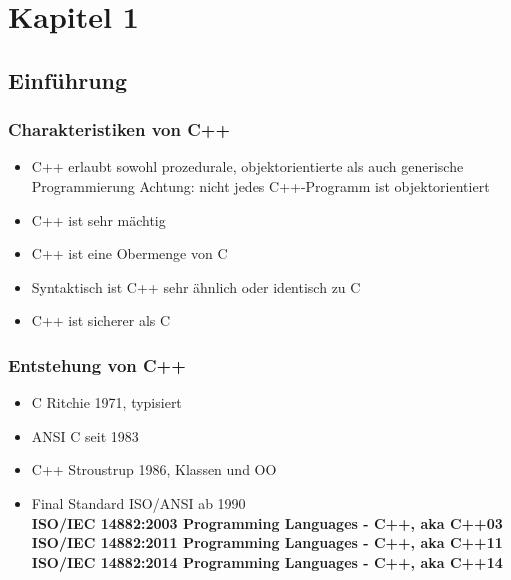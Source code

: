 
\section{Kapitel 1\hfill}
\label{sec:Kapitel1}

\subsection{Einführung\hfill}
\label{sec:Einfuehrung}

\subsubsection{Charakteristiken von C++\hfill}
\label{sec:Charakteristiken von C++}
\begin{itemize}
	\item C++ erlaubt sowohl prozedurale, objektorientierte als auch generische Programmierung
		Achtung: nicht jedes C++-Programm ist objektorientiert
	\item C++ ist sehr mächtig
	\item C++ ist eine Obermenge von C
	\item Syntaktisch ist C++ sehr ähnlich oder identisch zu C
	\item C++ ist sicherer als C
\end{itemize}

\subsubsection{Entstehung von C++\hfill}
\label{sec:Entstehung von C++}
\begin{itemize}
	\item C 					Ritchie 1971, typisiert
	\item ANSI C 				seit 1983
	\item C++ 					Stroustrup 1986, Klassen und OO
	\item Final Standard ISO/ANSI 	ab 1990 
	\vspace{3mm}
	\\ \textbf{ISO/IEC 14882:2003 Programming Languages - C++, aka C++03} 			
	\vspace{3mm}
	\\ \textbf{ISO/IEC 14882:2011 Programming Languages - C++, aka C++11}
	\vspace{3mm}
	\\ \textbf{ISO/IEC 14882:2014 Programming Languages - C++, aka C++14}
\end{itemize}

